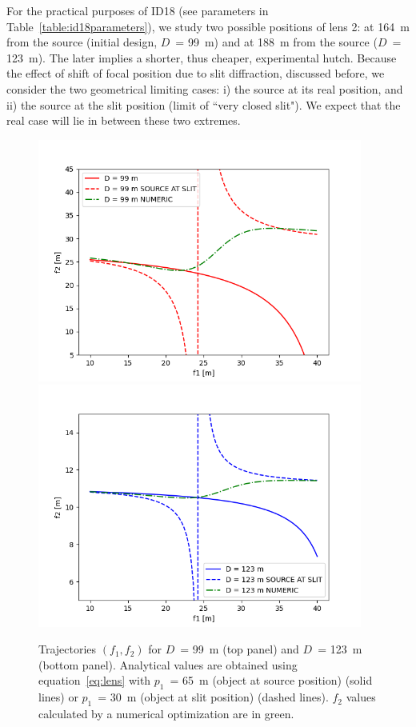 \documentclass{iucr}              %
\newcommand{\inblue}[1]{{\color{blue}#1}}
\newcommand{\inred}[1]{{\color{red}#1}}
\newcommand{\ingreen}[1]{{\color{green}#1}}
\begin{document}
For the practical purposes of ID18 (see parameters in Table~\ref{table:id18parameters}), we study two possible positions of lens 2: at \SI{164}{\meter} from the source (initial design, $D$~= \SI{99}{\meter}) and at \SI{188}{\meter} from the source ($D$~= \SI{123}{\meter}). The later implies a shorter, thus cheaper, experimental hutch. Because the effect of shift of focal position due to slit diffraction, discussed before, we consider the two geometrical limiting cases: i) the source at its real position, and ii) the source at the slit position (limit of ``very closed slit"). We expect that the real case will lie in between these two extremes. 

\begin{figure}
    \centering
    \includegraphics[width=0.95\textwidth]{figures/Figure_trajectories_99.png}
    \includegraphics[width=0.95\textwidth]{figures/Figure_trajectories_123.png}
    \caption{Trajectories $(f_1,f_2)$ for $D$~= \SI{99}{\meter} (\inred{top panel}) and $D$~= \SI{123}{\meter} (\inblue{bottom panel}).
    Analytical values are obtained using equation~\ref{eq:lens} with $p_1$~= \SI{65}{\meter} (object at source position) (solid lines) or $p_1$~= \SI{30}{\meter} (object at slit position) (dashed lines). $f_2$ values calculated by a numerical optimization are in \ingreen{green}.
    }
    \label{fig:f1f2map}
\end{figure}
\end{document}
